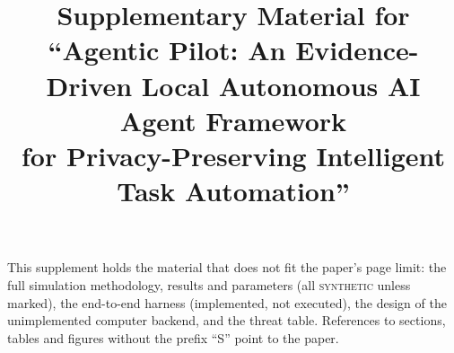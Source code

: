 \documentclass[conference]{IEEEtran}
\begin{document}

\title{Supplementary Material for\\ ``Agentic Pilot: An Evidence-Driven Local Autonomous AI Agent Framework\\for Privacy-Preserving Intelligent Task Automation''}
\author{}
\maketitle

This supplement holds the material that does not fit the paper's page limit: the full simulation methodology, results and parameters (all \textsc{synthetic} unless marked), the end-to-end harness (implemented, not executed), the design of the unimplemented computer backend, and the threat table. References to sections, tables and figures without the prefix ``S'' point to the paper.












\end{document}
